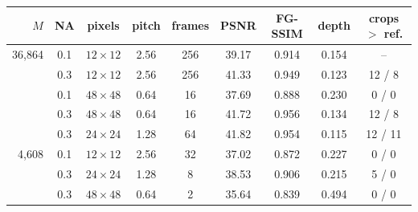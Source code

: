 \begin{tabular}{@{}r cccc ccc c@{}}\toprule
$M$ & NA & pixels & pitch & frames & PSNR & FG-SSIM & depth & crops $>$ ref.\\\midrule
36{,}864 & 0.1 & $12\times12$ & 2.56 & 256 & 39.17 & 0.914 & 0.154 & --\\
 & 0.3 & $12\times12$ & 2.56 & 256 & 41.33 & 0.949 & 0.123 & 12 / 8\\
 & 0.1 & $48\times48$ & 0.64 & 16 & 37.69 & 0.888 & 0.230 & 0 / 0\\
 & 0.3 & $48\times48$ & 0.64 & 16 & 41.72 & 0.956 & 0.134 & 12 / 8\\
 & 0.3 & $24\times24$ & 1.28 & 64 & 41.82 & 0.954 & 0.115 & 12 / 11\\
\midrule
4{,}608 & 0.1 & $12\times12$ & 2.56 & 32 & 37.02 & 0.872 & 0.227 & 0 / 0\\
 & 0.3 & $24\times24$ & 1.28 & 8 & 38.53 & 0.906 & 0.215 & 5 / 0\\
 & 0.3 & $48\times48$ & 0.64 & 2 & 35.64 & 0.839 & 0.494 & 0 / 0\\
\bottomrule\end{tabular}
